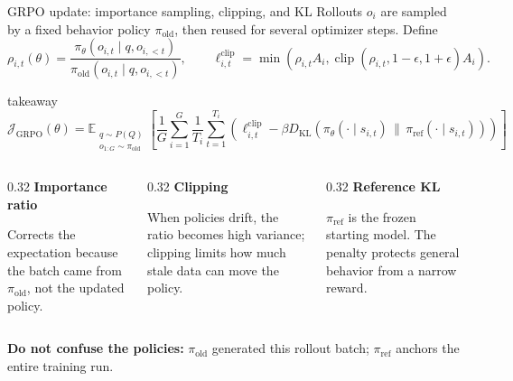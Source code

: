 \begin{frame}[t]{GRPO update: importance sampling, clipping, and KL}
  \small
  Rollouts $o_i$ are sampled by a fixed behavior policy $\pi_{\mathrm{old}}$, then reused for several optimizer steps. Define
  \[
    \rho_{i,t}(\theta)
    =\frac{\pi_\theta(o_{i,t}\mid q,o_{i,<t})}
           {\pi_{\mathrm{old}}(o_{i,t}\mid q,o_{i,<t})},
    \qquad
    \ell^{\mathrm{clip}}_{i,t}
    =\min\!\left(\rho_{i,t}A_i,
      \operatorname{clip}(\rho_{i,t},1-\epsilon,1+\epsilon)A_i\right).
  \]

  \vspace{-1mm}
  \begin{beamercolorbox}[wd=\textwidth,sep=1.3mm]{takeaway}
    \[
      \boxed{
      \mathcal J_{\mathrm{GRPO}}(\theta)
      =\mathbb E_{\substack{q\sim P(Q)\\o_{1:G}\sim\pi_{\mathrm{old}}}}
      \!\left[
        \frac{1}{G}\sum_{i=1}^{G}\frac{1}{T_i}\sum_{t=1}^{T_i}
        \left(
          \ell^{\mathrm{clip}}_{i,t}
          -\beta D_{\mathrm{KL}}\!\left(
            \pi_\theta(\cdot\mid s_{i,t})\,\|\,\pi_{\mathrm{ref}}(\cdot\mid s_{i,t})
          \right)
        \right)
      \right] }
    \]
  \end{beamercolorbox}

  \vspace{2mm}
  \begin{columns}[T,onlytextwidth]
    \begin{column}{0.32\textwidth}
      {\color{DeckBlue}\textbf{Importance ratio}}

      \footnotesize Corrects the expectation because the batch came from $\pi_{\mathrm{old}}$, not the updated policy.
    \end{column}
    \begin{column}{0.32\textwidth}
      {\color{DeckGold}\textbf{Clipping}}

      \footnotesize When policies drift, the ratio becomes high variance; clipping limits how much stale data can move the policy.
    \end{column}
    \begin{column}{0.32\textwidth}
      {\color{DeckTeal}\textbf{Reference KL}}

      \footnotesize $\pi_{\mathrm{ref}}$ is the frozen starting model. The penalty protects general behavior from a narrow reward.
    \end{column}
  \end{columns}

  \vspace{0mm}
  {\scriptsize\textbf{Do not confuse the policies:} $\pi_{\mathrm{old}}$ generated this rollout batch; $\pi_{\mathrm{ref}}$ anchors the entire training run.}
\end{frame}
